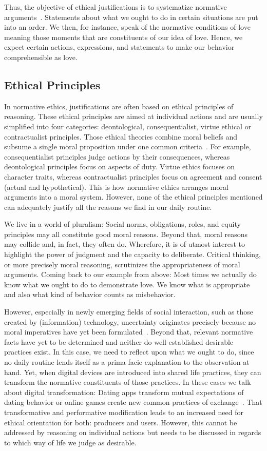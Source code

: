 \documentclass[manuscript,screen]{acmart}
\begin{document}
Thus, the objective of ethical justifications is to systematize normative arguments~\cite[p.9]{nida1998ethische}. Statements about what we ought to do in certain situations are put into an order. We then, for instance, speak of the normative conditions of love meaning those moments that are constituents of our idea of love. Hence, we expect certain actions, expressions, and statements to make our behavior comprehensible as love. 


\subsection{ Ethical Principles}
In normative ethics, justifications are often based on ethical principles of reasoning. These ethical principles are aimed at individual actions and are usually simplified into four categories: deontological, consequentialist, virtue ethical or contractualist principles. Those ethical theories combine moral beliefs and subsume a single moral proposition under one common criteria~\cite{nida1998ethische}. For example, consequentialist principles judge actions by their consequences, whereas deontological principles focus on aspects of duty. Virtue ethics focuses on character traits, whereas contractualist principles focus on agreement and consent (actual and hypothetical). This is how normative ethics arranges moral arguments into a moral system. However, none of the ethical principles mentioned can adequately justify all the reasons we find in our daily routine.

We live in a world of pluralism: Social norms, obligations, roles, and equity principles may all constitute good moral reasons. Beyond that, moral reasons may collide and, in fact, they often do. Wherefore, it is of utmost interest to highlight the power of judgment and the capacity to deliberate. Critical thinking, or more precisely moral reasoning, scrutinizes the appropriateness of moral arguments. Coming back to our example from above: Most times we actually do know what we ought to do to demonstrate love. We know what is appropriate and also what kind of behavior counts as misbehavior.  
 
However, especially in newly emerging fields of social interaction, such as those created by (information) technology, uncertainty originates precisely because no moral imperatives have yet been formulated~\cite{vallor2016technology}. Beyond that, relevant normative facts have yet to be determined and neither do well-established desirable practices exist. In this case, we need to reflect upon what we ought to do, since no daily routine lends itself as a prima facie explanation to the observation at hand. Yet, when digital devices are introduced into shared life practices, they can transform the normative constituents of those practices. In these cases we talk about digital transformation: Dating apps transform mutual expectations of dating behavior or online games create new common practices of exchange~\cite{flanagan2005values}. That transformative and performative modification leads to an increased need for ethical orientation for both: producers and users. However, this cannot be addressed by reasoning on individual actions but needs to be discussed in regards to which way of life we judge as desirable.
\end{document}
